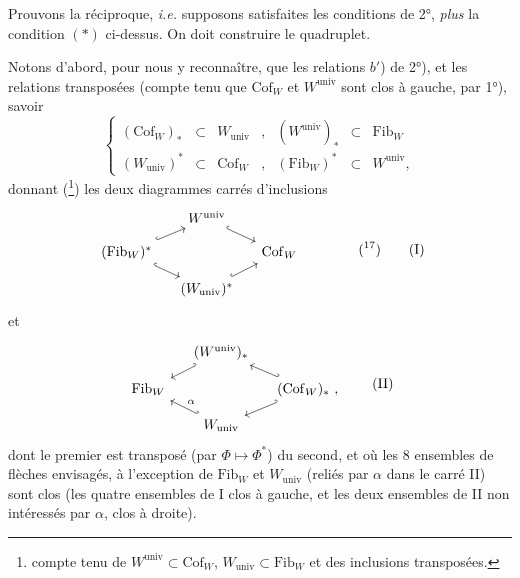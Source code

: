 \documentclass[11pt]{article}
\newcommand{\printedpage}[1]{\marginpar{\footnotesize p.~#1}}
\newcommand{\msp}[1]{\marginpar{\footnotesize [#1]}}
\newcommand{\Cof}{\mathrm{Cof}}
\newcommand{\Fib}{\mathrm{Fib}}
\newcommand{\univ}{\mathrm{univ}}
\begin{document}
Prouvons la réciproque, \textit{i.e.} supposons satisfaites les conditions de 2°, \textit{plus} la condition $(*)$ ci-dessus. On doit construire le quadruplet.

\msp{page 22}

Notons d'abord, pour nous y reconnaître, que les relations $b'$) de 2°), et les relations transposées (compte tenu que $\Cof_W$ et $W^{\univ}$ sont clos à gauche, par 1°), savoir
\[ \left\{ \begin{array}{lllllll}
(\Cof_W)_* & \subset & W_{\univ} & , & (W^{\univ})_* & \subset & \Fib_W \\
(W_{\univ})^* & \subset & \Cof_W & , & (\Fib_W)^* & \subset & W^{\univ},
\end{array} \right. \]
donnant (\footnote[16]{compte tenu de $W^{\univ} \subset \Cof_W$, $W_{\univ} \subset \Fib_W$ et des inclusions transposées.}) les deux diagrammes carrés d'inclusions
\printedpage{13}
\[
\begin{tikzcd}[column sep=small, row sep=small]
 & W^{\univ} \arrow[dr, hook] & \\
(\Fib_W)^* \arrow[ur, hook] \arrow[dr, hook] & & \Cof_W \\
 & (W_{\univ})^* \arrow[ur, hook] &
\end{tikzcd}
\qquad\qquad (\text{\footnotemark[17]})
\tag*{(I)}
\]
et
\[
\begin{tikzcd}[column sep=small, row sep=small]
 & (W^{\univ})_* \arrow[dl, hook'] & \\
\Fib_W & & (\Cof_W)_*\ , \arrow[ul, hook'] \arrow[dl, hook'] \\
 & W_{\univ} \arrow[ul, hook', "\alpha"'] &
\end{tikzcd}
\tag*{(II)}
\]
dont le premier est transposé (par $\Phi \longmapsto \Phi^*$) du second, et où les 8 ensembles de flèches envisagés, à l'exception de $\Fib_W$ et $W_{\univ}$ (reliés par $\alpha$ dans le carré II) sont clos (les quatre ensembles de I clos à gauche, et les deux ensembles de II non intéressés par $\alpha$, clos à droite).

\msp{page 23}
\end{document}
